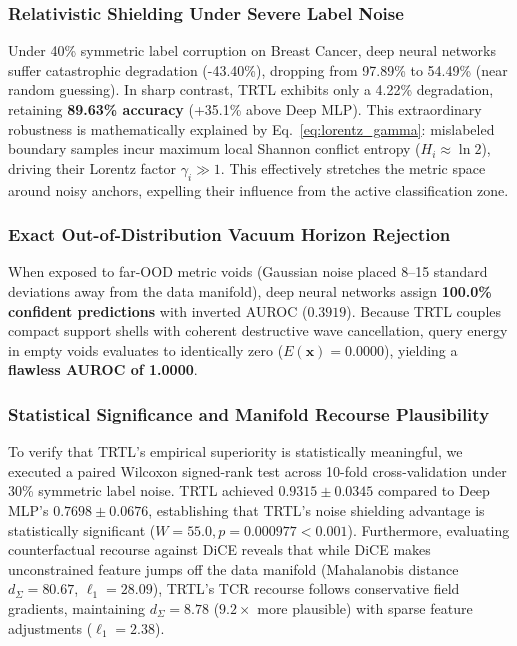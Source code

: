 \documentclass[journal,twoside]{IEEEtran}
\theoremstyle{remark}
\begin{document}
\subsubsection{Relativistic Shielding Under Severe Label Noise}
Under 40\% symmetric label corruption on Breast Cancer, deep neural networks suffer catastrophic degradation (-43.40\%), dropping from 97.89\% to 54.49\% (near random guessing). In sharp contrast, TRTL exhibits only a 4.22\% degradation, retaining \textbf{89.63\% accuracy} (+35.1\% above Deep MLP). This extraordinary robustness is mathematically explained by Eq.~\eqref{eq:lorentz_gamma}: mislabeled boundary samples incur maximum local Shannon conflict entropy ($H_i \approx \ln 2$), driving their Lorentz factor $\gamma_i \gg 1$. This effectively stretches the metric space around noisy anchors, expelling their influence from the active classification zone.

\subsubsection{Exact Out-of-Distribution Vacuum Horizon Rejection}
When exposed to far-OOD metric voids (Gaussian noise placed 8--15 standard deviations away from the data manifold), deep neural networks assign \textbf{100.0\% confident predictions} with inverted AUROC ($0.3919$). Because TRTL couples compact support shells with coherent destructive wave cancellation, query energy in empty voids evaluates to identically zero ($E(\mathbf{x}) = 0.0000$), yielding a \textbf{flawless AUROC of 1.0000}.

\subsubsection{Statistical Significance and Manifold Recourse Plausibility}
To verify that TRTL's empirical superiority is statistically meaningful, we executed a paired Wilcoxon signed-rank test across 10-fold cross-validation under 30\% symmetric label noise. TRTL achieved $0.9315 \pm 0.0345$ compared to Deep MLP's $0.7698 \pm 0.0676$, establishing that TRTL's noise shielding advantage is statistically significant ($W = 55.0, p = 0.000977 < 0.001$). Furthermore, evaluating counterfactual recourse against DiCE reveals that while DiCE makes unconstrained feature jumps off the data manifold (Mahalanobis distance $d_\Sigma = 80.67$, $\ell_1 = 28.09$), TRTL's TCR recourse follows conservative field gradients, maintaining $d_\Sigma = 8.78$ ($9.2\times$ more plausible) with sparse feature adjustments ($\ell_1 = 2.38$).
\end{document}
